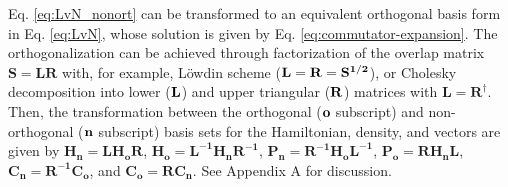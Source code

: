 \documentclass[journal=jctcce,manuscript=article,etalmode=truncate,maxauthors=10,layout=twocolumn,9pt]{achemso}   %
\begin{document}
Eq. \ref{eq:LvN_nonort} can  be transformed to an equivalent orthogonal  basis form in Eq. \ref{eq:LvN}, 
whose solution is given by  Eq. \ref{eq:commutator-expansion}. 
The  orthogonalization  can  be achieved  through  factorization of the overlap matrix $\mathbf{ S=LR}$ 
with, for example,   L\"owdin scheme ($\vb{L=R=S^{1/2}}$), or  Cholesky decomposition into 
 lower ($\vb{L}$) and  upper triangular  ($\vb{R}$)  matrices with $\mathbf{L=R^\dag}$.
Then, the  transformation between the orthogonal ($\vb{o}$ subscript) and non-orthogonal ($\vb{n}$ subscript)
basis sets for the  Hamiltonian, density, and vectors  are given by $\mathbf{H_n= L H_o R }$,
$\mathbf{H_o= L^{-1}  H_n R^{-1}}$,  $\mathbf{P_n= R^{-1} H_o L^{-1} }$,   $\mathbf{P_o= R H_n L }$,
$\mathbf{C_n= R^{-1} C_o }$, and $\mathbf{C_o= R C_n }$. See Appendix A for discussion. 
\end{document}
